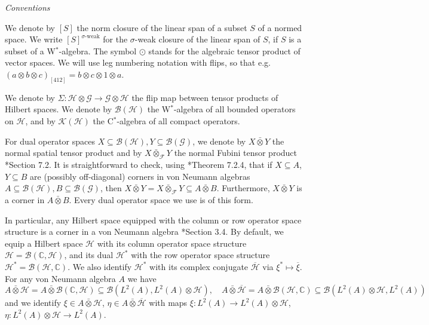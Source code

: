 \documentclass[reqno]{amsart}
\numberwithin{equation}{section}
\newcommand{\C}{\mathbb{C}}
\newcommand{\mcK}{\mathcal{K}}
\newcommand{\mcB}{\mathcal{B}}
\newcommand{\Hsp}{\mathcal{H}}
\newcommand{\Gsp}{\mathcal{G}}
\newcommand{\ov}{\overline}
\newcommand{\mc}{\mathcal}
\begin{document}
\emph{Conventions}

We denote by $[S]$ the norm closure of the linear span of a subset $S$ of a normed space. We write $[S]^{\sigma\textrm{-weak}}$ for the $\sigma$-weak closure of the linear span of $S$, if $S$ is a subset of a W$^*$-algebra. The symbol $\odot$ stands for the algebraic tensor product of vector spaces. We will use leg numbering notation with flips, so that e.g.~$(a\otimes b\otimes c)_{[412]}=b\otimes c \otimes 1\otimes a$.

We denote by $\Sigma\colon \Hsp \otimes \Gsp \rightarrow \Gsp \otimes \Hsp$ the flip map between tensor products of Hilbert spaces. We denote by $\mcB(\Hsp)$ the W$^*$-algebra of all bounded operators on $\Hsp$, and by $\mcK(\Hsp)$ the C$^*$-algebra of all compact operators. 

For dual operator spaces $X\subseteq \mc{B}(\mc{H}),Y\subseteq\mc{B}(\mc{G})$, we denote by $X\bar\otimes Y$ the normal spatial tensor product and by $X\bar{\otimes}_{\mathcal{F}}Y$ the normal Fubini tensor product \cite{EffrosRuan}*{Section 7.2}. It is straightforward to check, using \cite{EffrosRuan}*{Theorem 7.2.4}, that if  $X\subseteq A$, $Y\subseteq B$ are (possibly off-diagonal) corners in von Neumann algebras $A\subseteq \mc{B}(\mc{H}),B\subseteq \mc{B}(\mc{G})$, then $X\bar\otimes Y=X\bar\otimes_{\mathcal{F}} Y\subseteq A\bar\otimes B$. Furthermore, $X\bar\otimes Y$ is a corner in $A\bar\otimes B$. Every dual operator space we use is of this form.

In particular, any Hilbert space equipped with the column or row operator space structure is a corner in a von Neumann algebra \cite{EffrosRuan}*{Section 3.4}. By default, we equip a Hilbert space $\mc{H}$ with its column operator space structure $\mc{H}=\mc{B}(\C,\mc{H})$, and its dual $\mc{H}^*$ with the row operator space structure $\mc{H}^*=\mc{B}(\mc{H},\C)$. We also identify $\mc{H}^*$ with its complex conjugate $\ov{\mc{H}}$ via $\xi^*\mapsto \ov{\xi}$. For any von Neumann algebra $A$ we have
\[
A\bar\otimes \mc{H}=A\bar\otimes \mc{B}(\C,\mc{H})\subseteq \mc{B}(L^2(A),L^2(A)\otimes \mc{H}),\quad
A\bar\otimes \ov{\mc{H}}=A\bar\otimes \mc{B}(\mc{H},\C)\subseteq \mc{B}(L^2(A)\otimes \mc{H},L^2(A))
\]
and we identify $\xi\in A\bar\otimes \mc{H}$, $\eta\in A\bar\otimes \ov{\mc{H}}$ with maps $\xi\colon L^2(A)\rightarrow L^2(A)\otimes \mc{H}$, $\eta\colon L^2(A)\otimes\mc{H}\rightarrow L^2(A)$.
\end{document}
